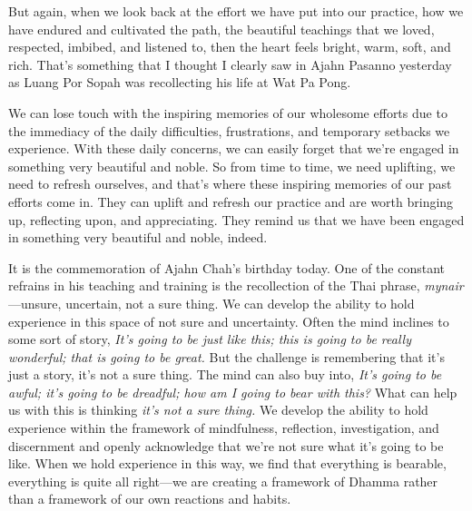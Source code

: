 But again, when we look back at the effort we have put into our 
practice, how we have endured and cultivated the path, the beautiful 
teachings that we loved, respected, imbibed, and listened to, then the 
heart feels bright, warm, soft, and rich. That's something that I 
thought I clearly saw in Ajahn Pasanno yesterday as Luang Por Sopah was 
recollecting his life at Wat Pa Pong.

We can lose touch with the inspiring memories of our wholesome efforts 
due to the immediacy of the daily difficulties, frustrations, and 
temporary setbacks we experience. With these daily concerns, we can 
easily forget that we're engaged in something very beautiful and noble. 
So from time to time, we need uplifting, we need to refresh ourselves, 
and that's where these inspiring memories of our past efforts come in. 
They can uplift and refresh our practice and are worth bringing up, 
reflecting upon, and appreciating. They remind us that we have been 
engaged in something very beautiful and noble, indeed.


It is the commemoration of Ajahn Chah's birthday today. One of the 
constant refrains in his teaching and training is the recollection of 
the Thai phrase, \emph{mynair}---unsure, uncertain, not a sure thing. 
We can develop the ability to hold experience in this space of not sure 
and uncertainty. Often the mind inclines to some sort of story, 
\emph{It's going to be just like this; this is going to be really 
wonderful; that is going to be great.} But the challenge is remembering 
that it's just a story, it's not a sure thing. The mind can also buy 
into, \emph{It's going to be awful; it's going to be dreadful; how am I 
going to bear with this?} What can help us with this is thinking 
\emph{it's not a sure thing.} We develop the ability to hold experience 
within the framework of mindfulness, reflection, investigation, and 
discernment and openly acknowledge that we're not sure what it's going 
to be like. When we hold experience in this way, we find that 
everything is bearable, everything is quite all right---we are creating 
a framework of Dhamma rather than a framework of our own reactions and 
habits.


